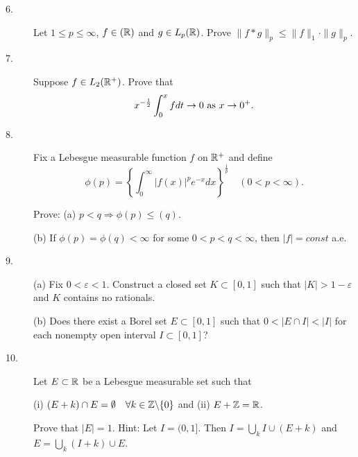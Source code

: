 \documentclass{article}
\begin{document}
\begin{description}
\item[6.]
Let $1 \leq p \leq \infty$, $f \in (\Bbb R)$ and $g \in L_p (\Bbb R)$. Prove
$\parallel f \ast g \parallel_p \leq \parallel f \parallel_1 \cdot
 \parallel g \parallel_p$.

\item[7.]
Suppose $f \in L_2(\Bbb R^+)$. Prove that
$$x^{-\frac{1}{2}} \int^x_0 fdt \to 0 \hbox{\ as\ } x \to 0^+.$$

\item[8.]
Fix a Lebesgue measurable function $f$ on $\Bbb R^+$ and define
$$\phi (p) = \left\{ \int^\infty_0 |f(x)|^p e^{-x} dx \right\}^{\frac{1}{p}}
\quad (0 < p< \infty).$$

Prove: (a) $p < q \Rightarrow \phi (p) \leq (q)$.

\item[\quad] (b)
If $\phi(p) = \phi(q) < \infty$ for some $0 < p< q< \infty$, then
$|f|= const$ a.e.

\item[9.] (a)
Fix $0 < \varepsilon < 1$. Construct a closed set $K \subset [0,1]$ such
that $|K| > 1 - \varepsilon$ and $K$ contains no rationals.

\item[\quad] (b)
Does there exist a Borel set $E \subset [0,1]$ such that
$0 < |E \cap I| < |I|$ for each nonempty open interval $I \subset [0,1]$?

\item[10.]
Let $E \subset \Bbb R$ be a Lebesgue measurable set such that

\item[\quad] (i)
$(E + k) \cap E = \emptyset \quad \forall k \in \Bbb Z \backslash \{0\}$
and (ii) $E + \Bbb Z = \Bbb R$.

Prove that $|E| = 1$. Hint: Let $I = (0,1]$. Then
$I = \bigcup_k I \cup (E + k)$ and $E = \bigcup_k (I + k) \cup E$.






\end{description}    
\end{document}
